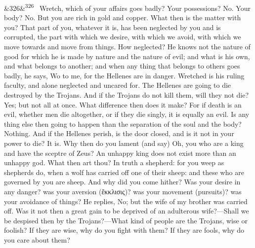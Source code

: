 \documentclass[12pt]{article}
\newcommand{\para}[1][]{\par\noindent\ifx&#1&\else\textsuperscript{\footnotesize #1}~\fi}
\begin{document}
\para[326] Wretch, which of your affairs goes badly? Your possessions? No. Your body? No. But you are rich in gold and copper. What then is the matter with you? That part of you, whatever it is, has been neglected by you and is corrupted, the part with which we desire, with which we avoid, with which we move towards and move from things. How neglected? He knows not the nature of good for which he is made by nature and the nature of evil; and what is his own, and what belongs to another; and when any thing that belongs to others goes badly, he says, Wo to me, for the Hellenes are in danger. Wretched is his ruling faculty, and alone neglected and uncared for. The Hellenes are going to die destroyed by the Trojans. And if the Trojans do not kill them, will they not die? Yes; but not all at once. What difference then does it make? For if death is an evil, whether men die altogether, or if they die singly, it is equally an evil. Is any thing else then going to happen than the separation of the soul and the body? Nothing. And if the Hellenes perish, is the door closed, and is it not in your power to die? It is. Why then do you lament (and say) Oh, you who are a king and have the sceptre of Zeus? An unhappy king does not exist more than an unhappy god. What then art thou? In truth a shepherd: for you weep as shepherds do, when a wolf has carried off one of their sheep: and these who are governed by you are sheep. And why did you come hither? Was your desire in any danger? was your aversion (ἔκκλισις)? was your movement (pursuits)? was your avoidance of things? He replies, No; but the wife of my brother was carried off. Was it not then a great gain to be deprived of an adulterous wife?—Shall we be despised then by the Trojans?—What kind of people are the Trojans, wise or foolish? If they are wise, why do you fight with them? If they are fools, why do you care about them?
\end{document}
